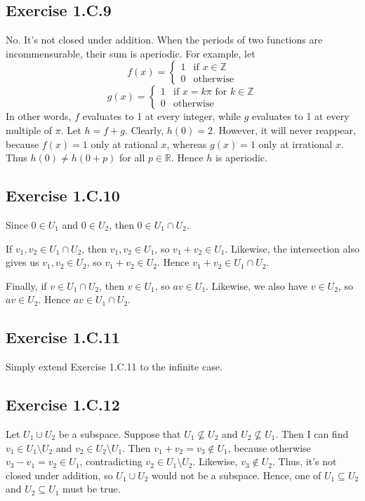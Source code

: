 \documentclass{book}
\begin{document}
\subsection*{Exercise 1.C.9}
No. It's not closed under addition. When the periods of two functions are incommensurable, their sum is aperiodic. For example, let
$$f(x) = \begin{cases}
    1 & \text{if } x \in \mathbb{Z} \\
    0 & \text{otherwise}
\end{cases}$$
$$g(x) = \begin{cases}
    1 & \text{if } x = k\pi \text{ for } k \in \mathbb{Z} \\
    0 & \text{otherwise}
\end{cases}$$
In other words, $f$ evaluates to 1 at every integer, while $g$ evaluates to 1 at every multiple of $\pi$. Let $h = f + g$. Clearly, $h(0) = 2$. However, it will never reappear, because $f(x) = 1$ only at rational $x$, whereas $g(x) = 1$ only at irrational $x$. Thus $h(0) \neq h(0 + p)$ for all $p \in \mathbb{R}$. Hence $h$ is aperiodic.

\subsection*{Exercise 1.C.10}
Since $0 \in U_1$ and $0 \in U_2$, then $0 \in U_1 \cap U_2$.

If $v_1, v_2 \in U_1 \cap U_2$, then $v_1, v_2 \in U_1$, so $v_1 + v_2 \in U_1$. Likewise, the intersection also gives us $v_1, v_2 \in U_2$, so $v_1 + v_2 \in U_2$. Hence $v_1 + v_2 \in U_1 \cap U_2$.

Finally, if $v \in U_1 \cap U_2$, then $v \in U_1$, so $av \in U_1$. Likewise, we also have $v \in U_2$, so $av \in U_2$. Hence $av \in U_1 \cap U_2$.

\subsection*{Exercise 1.C.11}
Simply extend Exercise 1.C.11 to the infinite case.

\subsection*{Exercise 1.C.12}
Let $U_1 \cup U_2$ be a subspace. Suppose that $U_1 \not \subseteq U_2$ and $U_2 \not \subseteq U_1$. Then I can find $v_1 \in U_1 \setminus U_2$ and $v_2 \in U_2 \setminus U_1$. Then $v_1 + v_2 = v_3 \not \in U_1$, because otherwise $v_3 - v_1 = v_2 \in U_1$, contradicting $v_2 \in U_1 \setminus U_2$. Likewise, $v_3 \not \in U_2$. Thus, it's not closed under addition, so $U_1 \cup U_2$ would not be a subspace. Hence, one of $U_1 \subseteq U_2$ and $U_2 \subseteq U_1$ must be true.
\end{document}
